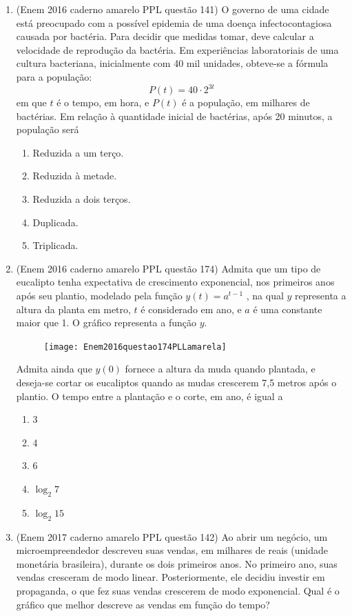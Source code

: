 \begin{enumerate}
	\item (Enem 2016 caderno amarelo PPL questão 141) O governo de uma cidade está preocupado com a possível epidemia de uma doença infectocontagiosa causada por bactéria. Para decidir que medidas tomar, deve calcular a velocidade de reprodução da bactéria. Em experiências laboratoriais de uma cultura bacteriana, inicialmente com 40 mil unidades, obteve-se a fórmula para a população:
	$$ P(t)=40\cdot 2^{3t} $$
	em que $ t $ é o tempo, em hora, e $ P(t) $ é a população, em milhares de bactérias. Em relação à quantidade inicial de bactérias, após 20 minutos, a população será
	\begin{enumerate}
		\item Reduzida a um terço.
		\item Reduzida à metade.
		\item Reduzida a dois terços.
		\item Duplicada.
		\item Triplicada.
	\end{enumerate}
	
	\clearpage

	\item (Enem 2016 caderno amarelo PPL questão 174) Admita que um tipo de eucalipto tenha expectativa de crescimento exponencial, nos primeiros anos após seu plantio, modelado pela função $ y(t)=a^{t-1} $ , na qual $ y $ representa a altura da planta em metro, $ t $ é considerado em ano, e $ a $ é uma constante maior que 1. O gráfico representa a função $ y $.
	\begin{figure}[H]
		\centering
		\texttt{[image: Enem2016questao174PLLamarela]}
		\caption{}
		\label{fig:enem2016questao174pllamarela}
	\end{figure}
	
	Admita ainda que $ y(0) $ fornece a altura da muda quando plantada, e deseja-se cortar os eucaliptos quando as mudas crescerem 7,5 metros após o plantio. O tempo entre a plantação e o corte, em ano, é igual a
	\begin{enumerate}
		\item 3
		\item 4
		\item 6
		\item $ \log_2 7 $
		\item $ \log_2 15 $
	\end{enumerate}
	
	\item (Enem 2017 caderno amarelo PPL questão 142) Ao abrir um negócio, um microempreendedor descreveu suas vendas, em milhares de reais (unidade monetária brasileira), durante os dois primeiros anos. No primeiro ano, suas vendas cresceram de modo linear. Posteriormente, ele decidiu investir em propaganda, o que fez suas vendas crescerem de modo exponencial.
	Qual é o gráfico que melhor descreve as vendas em função do tempo?


\end{enumerate}
